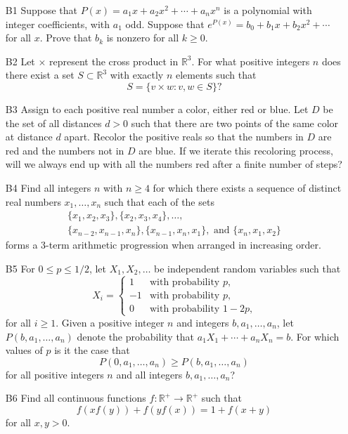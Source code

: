 \documentclass[amssymb,twocolumn,pra,10pt,aps,nofootinbib]{revtex4-1}
\begin{document}
\begin{itemize}
\item[B1]
Suppose that $P(x) = a_1 x + a_2 x^2 + \cdots + a_n x^n$ is a polynomial with integer coefficients, with $a_1$ odd. Suppose that $e^{P(x)} = b_0 + b_1 x + b_2 x^2 + \cdots$ for all $x$. Prove that $b_k$ is nonzero for all $k \geq 0$.

\item[B2]
Let $\times$ represent the cross product in $\mathbb{R}^3$. For what positive integers $n$ does there exist a set $S \subset \mathbb{R}^3$ with exactly $n$ elements such that 
\[
S = \{v \times w: v, w \in S\}?
\]

\item[B3]
Assign to each positive real number a color, either red or blue. Let $D$ be the set of all distances $d > 0$ such that there are two points of the same color at distance $d$ apart. Recolor the positive reals so that the numbers in $D$ are red and the numbers not in $D$ are blue. If we iterate this recoloring process, will we always end up with all the numbers red after a finite number of steps?

\smallskip

\item[B4]
Find all integers $n$ with $n \geq 4$ for which there exists a sequence of distinct real numbers $x_1,\dots,x_n$ such that each of the sets
\begin{gather*}
\{x_1,x_2,x_3\}, \{x_2,x_3,x_4\}, \dots, \\
\{x_{n-2},x_{n-1},x_n\}, \{x_{n-1},x_n, x_1\}, \mbox{ and } \{x_n, x_1, x_2\}
\end{gather*}
forms a 3-term arithmetic progression when arranged in increasing order.

\item[B5]
For $0 \leq p \leq 1/2$, let $X_1, X_2, \dots$ be independent random variables such that
\[
X_i = \begin{cases} 1 & \mbox{with probability $p$,} \\
-1 & \mbox{with probability $p$,} \\
0 & \mbox{with probability $1-2p$,}
\end{cases}
\]
for all $i \geq 1$. Given a positive integer $n$ and integers $b, a_1, \dots, a_n$, let $P(b, a_1, \dots, a_n)$ denote the probability that $a_1 X_1 + \cdots + a_n X_n = b$. For which values of $p$ is it the case that
\[
P(0, a_1, \dots, a_n) \geq P(b, a_1, \dots, a_n)
\]
for all positive integers $n$ and all integers $b, a_1, \dots, a_n$?

\item[B6]
Find all continuous functions $f: \mathbb{R}^+ \to \mathbb{R}^+$ such that
\[
f(xf(y)) + f(yf(x)) = 1 + f(x+y)
\]
for all $x,y > 0$.
\end{itemize}
\end{document}
